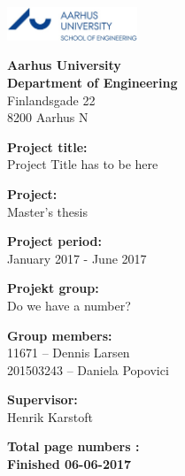 \newpage

{}


\begin{minipage}[t]{0.48\textwidth}
\vspace*{14pt}			%
\vspace{1.2cm}
\includegraphics[height=1cm]{Figures/au_ingenioerhoejskolen_en_logo.jpg} 
\end{minipage}
\hfill

\vspace*{1cm}

\begin{minipage}[t]{1\textwidth}

{\small 
\flushleft
\textbf{Aarhus University}\\
\textbf{Department of Engineering}  \\
Finlandsgade 22 \\
8200 Aarhus N \\
}

\vspace*{1cm}

\textbf{Project title:} \\[5pt]\bigskip\hspace{2ex}
Project Title has to be here

\textbf{Project:} \\[5pt]\bigskip\hspace{2ex}
Master's thesis

\textbf{Project period:} \\[5pt]\bigskip\hspace{2ex}
January 2017 - June 2017

\textbf{Projekt group:} \\[5pt]\bigskip\hspace{2ex}
Do we have a number?

\textbf{Group members:} \\[5pt]\hspace*{2ex}
11671 	  -- Dennis Larsen \\\hspace*{2ex}
201503243 -- Daniela Popovici \\\hspace*{2ex}



\textbf{Supervisor:} \\[5pt]\hspace*{2ex}
Henrik Karstoft \\\bigskip\hspace{2ex}

\vspace*{1cm}

\textbf{Total page numbers : \pageref{LastPage}} \\
\textbf{Finished 06-06-2017}


\end{minipage}
\hfill
\vfill

